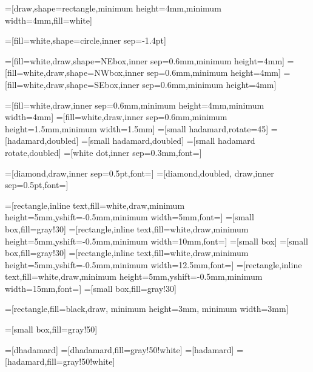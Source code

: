 
=[draw,shape=rectangle,minimum height=4mm,minimum width=4mm,fill=white]

=[fill=white,shape=circle,inner sep=-1.4pt]

=[fill=white,draw,shape=NEbox,inner sep=0.6mm,minimum height=4mm]
=[fill=white,draw,shape=NWbox,inner sep=0.6mm,minimum height=4mm]
=[fill=white,draw,shape=SEbox,inner sep=0.6mm,minimum height=4mm]


=[fill=white,draw,inner sep=0.6mm,minimum height=4mm,minimum width=4mm]
=[fill=white,draw,inner sep=0.6mm,minimum height=1.5mm,minimum width=1.5mm]
=[small hadamard,rotate=45]
=[hadamard,doubled]
=[small hadamard,doubled]
=[small hadamard rotate,doubled]
=[white dot,inner sep=0.3mm,font=\footnotesize]

=[diamond,draw,inner sep=0.5pt,font=\small]
=[diamond,doubled, draw,inner sep=0.5pt,font=\small]

=[rectangle,inline text,fill=white,draw,minimum height=5mm,yshift=-0.5mm,minimum width=5mm,font=\small]
=[small box,fill=gray!30]
=[rectangle,inline text,fill=white,draw,minimum height=5mm,yshift=-0.5mm,minimum width=10mm,font=\small]
=[small box] %
=[small box,fill=gray!30]
=[rectangle,inline text,fill=white,draw,minimum height=5mm,yshift=-0.5mm,minimum width=12.5mm,font=\small]
=[rectangle,inline text,fill=white,draw,minimum height=5mm,yshift=-0.5mm,minimum width=15mm,font=\small]
=[small box,fill=gray!30]

=[rectangle,fill=black,draw, minimum height=3mm, minimum width=3mm]

=[small box,fill=gray!50]

=[dhadamard]
=[dhadamard,fill=gray!50!white]
=[hadamard]
=[hadamard,fill=gray!50!white]

